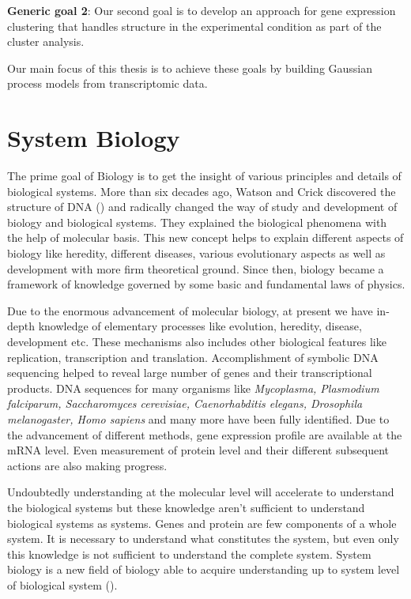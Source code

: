 \textbf{Generic goal 2}: Our second goal is to develop an approach for gene expression clustering that handles structure in the experimental condition as part of the cluster analysis.

Our main focus of this thesis is to achieve these goals by building Gaussian process models from transcriptomic data.

\section{System Biology}
The prime goal of Biology is to get the insight of various principles and details of biological systems. More than six decades ago, Watson and Crick discovered the structure of DNA (\cite{Watson:1953}) and radically changed the way of study and development of biology and biological systems. They explained the biological phenomena with the help of molecular basis. This new concept helps to explain different aspects of biology like heredity, different diseases, various evolutionary aspects as well as development with more firm theoretical ground. Since then, biology became a framework of knowledge governed by some basic and fundamental laws of physics.

Due to the enormous advancement of molecular biology, at present we have in-depth knowledge of elementary processes like evolution, heredity, disease, development etc. These mechanisms also includes other biological features like replication, transcription and translation. Accomplishment of symbolic DNA sequencing helped to reveal large number of genes and their transcriptional products. DNA sequences for many organisms like \textit{Mycoplasma, Plasmodium falciparum, Saccharomyces cerevisiae, \textit{Caenorhabditis elegans}, Drosophila melanogaster, Homo sapiens} and many more have been fully identified. Due to the advancement of different methods, gene expression profile are available at the mRNA level. Even measurement of protein level and their different subsequent actions are also making progress. 

Undoubtedly understanding at the molecular level will accelerate to understand the biological systems but these knowledge aren't sufficient to understand biological systems as systems. Genes and protein are few components of a whole system. It is necessary to understand what constitutes the system, but even only this knowledge is not sufficient to understand the complete system. System biology is a new field of biology able to acquire understanding up to system level of biological system (\cite{Kitano:2000}). 

